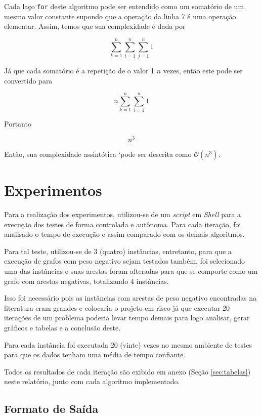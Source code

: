 \documentclass[12pt]{article}
\begin{document}
Cada laço \texttt{for} deste algoritmo pode ser entendido como um somatório de um mesmo valor constante supondo que a operação da linha 7 é uma operação elementar. Assim, temos que sua complexidade é dada por

    $$\sum_{k=1}^{n}\sum_{i=1}^{n}\sum_{j=1}^{n}1$$
    
Já que cada somatório é a repetição de o valor 1 $n$ vezes, então este pode ser convertido para

$$n\sum_{k=1}^{n}\sum_{i=1}^{n}1$$

Portanto

$$n^3$$

Então, sua complexidade assintótica `pode ser descrita como $\mathcal{O}(n^3)$.



\section{Experimentos}

Para a realização dos experimentos, utilizou-se de um \textit{script} em \textit{Shell} para a execução dos testes de forma controlada e autônoma. Para cada iteração, foi analisado o tempo de execução e assim comparado com os demais algoritmos.

Para tal teste, utilizou-se de 3 (quatro) instâncias, entretanto, para que a execução de grafos com peso negativo sejam testados também, foi selecionado uma das instâncias e suas arestas foram alteradas para que se comporte como um grafo com arestas negativas, totalizando 4 instâncias.

Isso foi necessário pois as instâncias com arestas de peso negativo encontradas na literatura eram grandes e colocaria o projeto em risco já que executar 20 iterações de um problema poderia levar tempo demais para logo analisar, gerar gráficos e tabelas e a conclusão deste.

Para cada instância foi executada 20 (vinte) vezes no mesmo ambiente de testes para que os dados tenham uma média de tempo confiante.

Todos os resultados de cada iteração são exibido em anexo (Seção \ref{sec:tabelas}) neste relatório, junto com cada algoritmo implementado.



\subsection{Formato de Saída}
\end{document}
